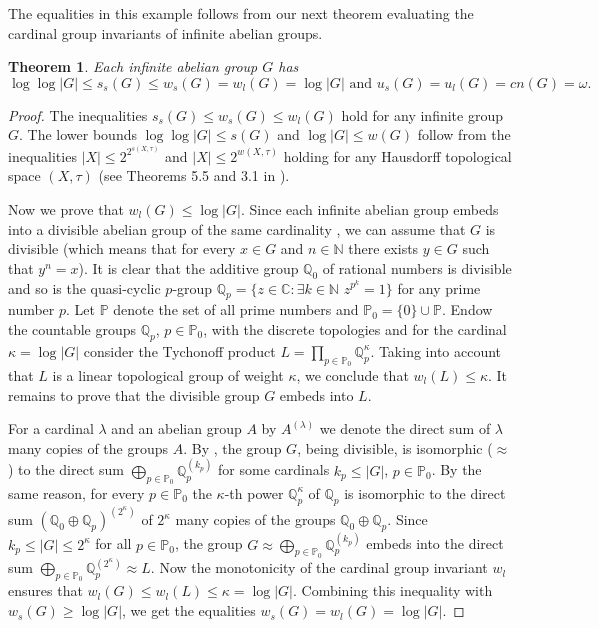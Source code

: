 \documentclass[11pt, twoside]{amsart}
\newtheorem{theorem}{Theorem}
\theoremstyle{definition}
\begin{document}
The equalities in this example follows from our next theorem evaluating the cardinal group invariants of infinite abelian groups. 

\begin{theorem}\label{t:ab} Each infinite abelian group $G$ has $$
\log\log |G|\le s_s(G)\le w_s(G)=w_l(G)=\log|G|\mbox{ \ and \ }
u_s(G)=u_l(G)={cn}(G)={\omega}.
$$
\end{theorem}

\begin{proof} The inequalities $s_s(G)\le w_s(G)\le w_l(G)$ hold for any infinite group $G$. The lower bounds $\log\log|G|\le s(G)$ and $\log|G|\le w(G)$ follow from the inequalities $|X|\le 2^{2^{s(X,\tau)}}$ and $|X|\le 2^{w(X,\tau)}$ holding for any Hausdorff topological space $(X,\tau)$ (see Theorems 5.5 and 3.1 in \cite{Hodel}).
\smallskip

Now we prove that $w_l(G)\le\log|G|$. Since each infinite abelian group embeds into a divisible abelian group of the same cardinality \cite[4.1.6]{Rob}, we can assume that $G$ is divisible (which means that for every $x\in G$ and $n\in{\mathbb N}$ there exists $y\in G$ such that $y^n=x$). It is clear that the additive group ${\mathbb Q}_0$ of rational numbers is divisible and so is the quasi-cyclic $p$-group ${\mathbb Q}_p=\{z\in{\mathbb C}:\exists k\in{\mathbb N}$ $z^{p^k}=1\}$ for any prime number $p$. Let ${\mathbb P}$ denote the set of all prime numbers and ${\mathbb P}_0=\{0\}\cup{\mathbb P}$. Endow the countable groups ${\mathbb Q}_p$, $p\in{\mathbb P}_0$, with the discrete topologies and for the cardinal $\kappa=\log|G|$ consider the Tychonoff product $L=\prod_{p\in{\mathbb P}_0}{\mathbb Q}_p^\kappa$. Taking into account that $L$ is a linear topological group of weight $\kappa$, we conclude that $w_l(L)\le \kappa$. It remains to prove that the divisible group $G$ embeds into $L$.

For a cardinal $\lambda$ and an abelian group $A$ by $A^{(\lambda)}$ we denote the direct sum of $\lambda$ many copies of the groups $A$. By \cite[4.1.5]{Rob}, the group $G$, being divisible, is isomorphic ($\approx$) to the direct sum $\bigoplus_{p\in {\mathbb P}_0}{\mathbb Q}_p^{(k_p)}$ for some cardinals $k_p\le|G|$, $p\in{\mathbb P}_0$. By the same reason, for every $p\in{\mathbb P}_0$ the $\kappa$-th power ${\mathbb Q}_p^\kappa$ of ${\mathbb Q}_p$ is isomorphic to the direct sum $({\mathbb Q}_0\oplus{\mathbb Q}_p)^{(2^\kappa)}$ of $2^\kappa$ many copies of the groups ${\mathbb Q}_0\oplus {\mathbb Q}_p$. Since $k_p\le|G|\le 2^\kappa$ for all $p\in{\mathbb P}_0$, the group $G\approx   \bigoplus_{p\in {\mathbb P}_0}{\mathbb Q}_p^{(k_p)}$ embeds into the direct sum $\bigoplus_{p\in{\mathbb P}_0}{\mathbb Q}_p^{(2^\kappa)}\approx L$. Now the monotonicity of the cardinal group invariant $w_l$ ensures that $w_l(G)\le w_l(L)\le\kappa=\log|G|$. Combining this inequality with $w_s(G)\ge\log |G|$, we get the equalities $w_s(G)=w_l(G)=\log |G|$.
\smallskip


\end{proof}
\end{document}
